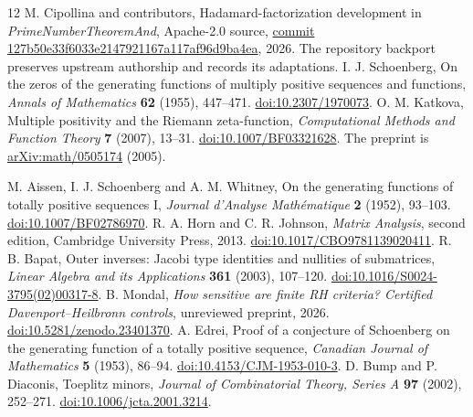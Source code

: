 \documentclass[11pt]{amsart}
\begin{document}
\begin{thebibliography}{12}
M. Cipollina and contributors, Hadamard-factorization development in
\emph{PrimeNumberTheoremAnd}, Apache-2.0 source,
\href{https://github.com/AlexKontorovich/PrimeNumberTheoremAnd/tree/127b50e33f6033e2147921167a117af96d9ba4ea}{commit 127b50e33f6033e2147921167a117af96d9ba4ea}, 2026.
The repository backport preserves upstream authorship and records its adaptations.
I. J. Schoenberg, On the zeros of the generating functions of multiply positive
sequences and functions, \emph{Annals of Mathematics} \textbf{62} (1955), 447--471.
\href{https://doi.org/10.2307/1970073}{doi:10.2307/1970073}.
O. M. Katkova, Multiple positivity and the Riemann zeta-function,
\emph{Computational Methods and Function Theory} \textbf{7} (2007), 13--31.
\href{https://doi.org/10.1007/BF03321628}{doi:10.1007/BF03321628}.
The preprint is \href{https://arxiv.org/abs/math/0505174}{arXiv:math/0505174} (2005).

M. Aissen, I. J. Schoenberg and A. M. Whitney,
On the generating functions of totally positive sequences I,
\emph{Journal d'Analyse Math\'ematique} \textbf{2} (1952), 93--103.
\href{https://doi.org/10.1007/BF02786970}{doi:10.1007/BF02786970}.
R. A. Horn and C. R. Johnson, \emph{Matrix Analysis}, second edition,
Cambridge University Press, 2013.
\href{https://doi.org/10.1017/CBO9781139020411}{doi:10.1017/CBO9781139020411}.
R. B. Bapat, Outer inverses: Jacobi type identities and nullities of submatrices,
\emph{Linear Algebra and its Applications} \textbf{361} (2003), 107--120.
\href{https://doi.org/10.1016/S0024-3795(02)00317-8}{doi:10.1016/S0024-3795(02)00317-8}.
B. Mondal, \emph{How sensitive are finite RH criteria? Certified Davenport--Heilbronn controls},
unreviewed preprint, 2026.
\href{https://doi.org/10.5281/zenodo.23401370}{doi:10.5281/zenodo.23401370}.
A. Edrei, Proof of a conjecture of Schoenberg on the generating function of a totally positive sequence, \emph{Canadian Journal of Mathematics} \textbf{5} (1953), 86--94.
\href{https://doi.org/10.4153/CJM-1953-010-3}{doi:10.4153/CJM-1953-010-3}.
D. Bump and P. Diaconis, Toeplitz minors, \emph{Journal of Combinatorial Theory, Series A} \textbf{97} (2002), 252--271.
\href{https://doi.org/10.1006/jcta.2001.3214}{doi:10.1006/jcta.2001.3214}.
\end{thebibliography}
\end{document}
